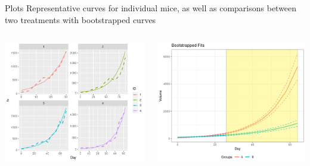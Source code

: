 \documentclass{beamer}
\begin{document}
\begin{frame}{Plots}
Representative curves for individual mice, as well as comparisons between two treatments with bootstrapped curves
\begin{columns}
\begin{column}{0.45\textwidth}
\begin{center}
\includegraphics[scale=0.45]{img/tumr_fit.png}
\end{center}
\end{column}
\begin{column}{0.5\textwidth}  %
\begin{center}
\includegraphics[scale=0.3]{img/tumr_boot.png}
\end{center}
\end{column}
\end{columns}



\end{frame}
\end{document}
